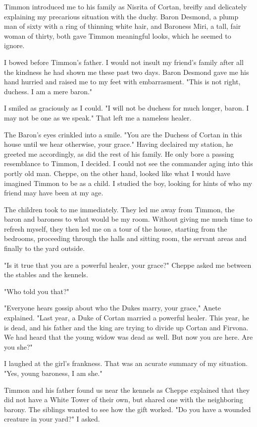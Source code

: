 \documentclass{article}
\begin{document}
\vspace{.5cm}

Timmon introduced me to his family as Nisrita of Cortan, breifly and delicately explaining my precarious situation with the duchy. Baron Desmond, a plump man of sixty with a ring of thinning white hair, and Baroness Miri, a tall, fair woman of thirty, both gave Timmon meaningful looks, which he seemed to ignore. 

I bowed before Timmon's father. I would not insult my friend's family after all the kindness he had shown me these past two days. Baron Desmond gave me his hand hurried and raised me to my feet with embarrasment. "This is not right, duchess. I am a mere baron." 

I smiled as graciously as I could. "I will not be duchess for much longer, baron. I may not be one as we speak." That left me a nameless healer.

The Baron's eyes crinkled into a smile. "You are the Duchess of Cortan in this house until we hear otherwise, your grace." Having declaired my station, he greeted me accordingly, as did the rest of his family. He only bore a passing resemblance to Timmon, I decided. I could not see the commander aging into this portly old man. Cheppe, on the other hand, looked like what I would have imagined Timmon to be as a child. I studied the boy, looking for hints of who my friend may have been at my age.

The children took to me immediately. They led me away from Timmon, the baron and baroness to what would be my room. Without giving me much time to refresh myself, they then led me on a tour of the house, starting from the bedrooms, proceeding through the halls and sitting room, the servant areas and finally to the yard outside. 

"Is it true that you are a powerful healer, your grace?" Cheppe asked me between the stables and the kennels.

"Who told you that?"

"Everyone hears gossip about who the Dukes marry, your grace," Anete explained. "Last year, a Duke of Cortan married a powerful healer. This year, he is dead, and his father and the king are trying to divide up Cortan and Firvona. We had heard that the young widow was dead as well. But now you are here. Are you she?"

I laughed at the girl's frankness. That was an acurate summary of my situation. "Yes, young baroness, I am she."

Timmon and his father found us near the kennels as Cheppe explained that they did not have a White Tower of their own, but shared one with the neighboring barony. The siblings wanted to see how the gift worked. "Do you have a wounded creature in your yard?" I asked.
\end{document}
